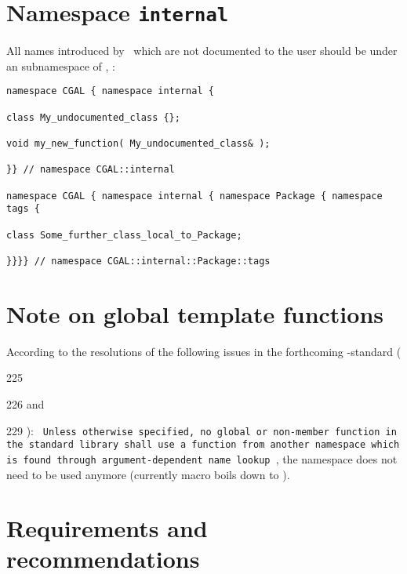 \section{Namespace {\tt internal}}
All names introduced by \cgal\ which are not documented to the user
should be under an  subnamespace of , \eg:
\begin{verbatim}
namespace CGAL { namespace internal {

class My_undocumented_class {};

void my_new_function( My_undocumented_class& );

}} // namespace CGAL::internal

namespace CGAL { namespace internal { namespace Package { namespace tags {

class Some_further_class_local_to_Package;

}}}} // namespace CGAL::internal::Package::tags
\end{verbatim}


\section{Note on global template functions}

According to the resolutions of the following issues in the forthcoming
\CC-standard (
  225%
  226 and%
  229
):
{\tt
Unless otherwise specified, no global or non-member function in the standard library 
shall use a function from another namespace which is found through argument-dependent
name lookup
}, the namespace  does not need to be used anymore 
(currently  macro boils down to ).

\section{Requirements and recommendations}

